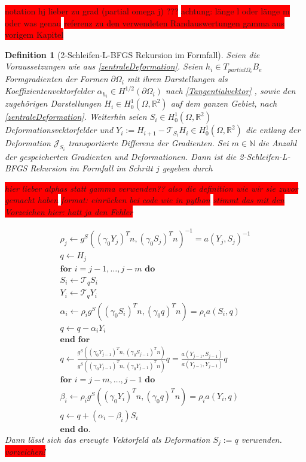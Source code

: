 \documentclass[bibliography=totoc,12pt,a4paper]{scrartcl}
\theoremstyle{exampstyle}
\newtheorem{defi}{Definition}%
\numberwithin{equation}{section}
\begin{document}
\colorbox{red}{notation hj lieber zu grad (partial omega j) ???}
\colorbox{red}{ achtung: länge l oder länge m oder was genau}
\colorbox{red}{referenz zu den verwendeten Randauswertungen gamma aus vorigem Kapitel}

\begin{defi}[2-Schleifen-L-BFGS Rekursion im Formfall]
	Seien die Voraussetzungen wie aus \ref{zentraleDeformation}. Seien $h_i \in T_{partial\Omega_i}B_e$ Formgradienten der Formen $\partial\Omega_i$ mit ihren Darstellungen als Koeffizientenvektorfelder $\alpha_{h_i} \in H^{1/2}(\partial\Omega_i)$ nach \ref{Tangentialvektor} , sowie den zugehörigen Darstellungen $H_i \in H^1_0(\Omega, \mathbb{R}^2)$ auf dem ganzen Gebiet, nach \ref{zentraleDeformation}. Weiterhin seien $S_i \in H^1_0(\Omega, \mathbb{R}^2)$ Deformationsvektorfelder und $Y_i := H_{i+1} - \mathcal{T}_{S_i}H_i \in H^1_0(\Omega, \mathbb{R}^2)$ die entlang der Deformation $\mathcal{J}_{S_i}$ transportierte Differenz der Gradienten. Sei $m \in \mathbb{N}$ die Anzahl der gespeicherten Gradienten und Deformationen. Dann ist die \textit{2-Schleifen-L-BFGS Rekursion im Formfall} im Schritt $j$ gegeben durch 

\colorbox{red}{hier lieber alphas statt gamma verwenden?? also die definition wie wir sie zuvor gemacht haben}
\colorbox{red}{format: einrücken bei code wie in python}
\colorbox{red}{stimmt das mit den Vorzeichen hier: hatt ja den Fehler}

\begin{align*}
	\rho_j \leftarrow g^S((\gamma_0 Y_j)^Tn, (\gamma_0 S_j)^Tn)^{-1} = a(Y_j, S_j)^{-1} \\
		q \leftarrow H_j \\
	\textbf{for } i = j - 1, \dots, j - m \textbf{ do} \\
		S_i \leftarrow \mathcal{T}_q S_i \\
		Y_i \leftarrow \mathcal{T}_q Y_i \\
		\alpha_i \leftarrow \rho_i g^S((\gamma_0 S_i)^Tn, (\gamma_0 q)^T n) = \rho_i a(S_i, q) \\
				q \leftarrow q - \alpha_i Y_i \\
	\textbf{end for} \\
	q \leftarrow \frac{g^S((\gamma_0 Y_{j-1})^Tn, (\gamma_0 S_{j-1})^Tn)}{g^S((\gamma_0 Y_{j-1})^Tn, (\gamma_0 Y_{j-1})^Tn)}q = \frac{a(Y_{j-1}, S_{j-1})}{a(Y_{j-1}, Y_{j-1})}q \\	
	\textbf{for } i = j - m, \dots, j - 1 \textbf{ do} \\
		\beta_i \leftarrow \rho_i g^S((\gamma_0 Y_i)^Tn, (\gamma_0 q)^Tn) = \rho_i a(Y_i, q) \\
		q \leftarrow q + (\alpha_i - \beta_i)S_i \\
		\textbf{end do.}
\end{align*}
	Dann lässt sich das erzeugte Vektorfeld als Deformation $S_j := q$ verwenden. \colorbox{red}{vorzeichen!}
\end{defi}
\end{document}
